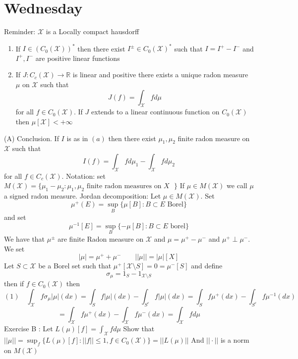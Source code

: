 \documentclass[11pt]{article}
\begin{document}
\section{Wednesday}
Reminder: $ \mathcal{X}$ is a Locally compact hausdorff
\begin{enumerate}
    \item If $I \in (C_0( \mathcal{X}))^{*}$ then there exist $I^{\pm} \in C_0( \mathcal{X})^{*}$ such that
        $I = I^{+} - I^{-}$ and $I^{+}, I^{-}$ are positive linear functions
    \item If $J: C_c( \mathcal{X}) \to \mathbb{R}$ is linear and positive there exists a unique radon
        measure $\mu$ on $ \mathcal{X}$ such that
        \[
        J(f)  = \int_{ \mathcal{X}}^{}f d\mu
        \] 
        for all $f \in C_0( \mathcal{X})$.
        If $J$ extends to a linear continuous function on  $ C_0( \mathcal{X})$ then
        $ \mu[ \mathcal{X}] < +\infty$
\end{enumerate}
(A) Conclusion. If $I $ is as in  $(a)$ then there exist  $\mu_1, \mu_2$ finite radon measure on $ \mathcal{X}$
such that
\[
I(f) = \int_{ \mathcal{X}}^{}f d\mu_1 - \int_{ \mathcal{X}}^{}f d\mu_2
\] 
for all $f \in C_c( \mathcal{X})$.
Notation: set $ M( \mathcal{X}) = \{ \mu_1 - \mu_2 : \mu_1,\mu_2 \text{ finite radon measures on $X$ }\}$ 
If $\mu \in M ( \mathcal{X})$ we call $\mu$ a signed radon measure.
Jordan decomposition: Let $\mu \in M( \mathcal{X})$. Set
\[
    \mu^{+}(E) = \sup_{B}\{ \mu[B]: B \subset E \text{ Borel}\}
\] 
and set
\[
    \mu^{-1}[E] = \sup_{B} \{-\mu[B] : B \subset E \text{ borel}\}
\] 
We have that $\mu^{\pm}$ are finite Radon measure
on $ \mathcal{X}$ and $\mu = \mu^{+} - \mu^{-}$ and $\mu^{+} \perp \mu^{-}$. We set
\[
    |\mu| = \mu^{+} + \mu^{-} \qquad ||\mu||  = |\mu|[X]
\] 
Let $S \subset \mathcal{X}$ be a Borel set such that $\mu^{+}[ \mathcal{X} \setminus S] = 0 = \mu^{-}[S]$ and define
\[
    \sigma_\mu = 1_{S} - 1_{ \mathcal{X} \setminus S}
\] 
then if $f \in C_0 ( \mathcal{X})$ then
\[
    (1) \quad  \int_{ \mathcal{X}}^{}f\sigma_\mu |\mu|(dx) = \int_{S} f |\mu|(dx) - \int_{ S^{c}}^{}f |\mu|(dx) = \int_{S}^{}f \mu^{+}(dx) - \int_{ S^{c}}^{}f \mu^{-1}(dx)
\] 
\[
= \int_{ \mathcal{X}}^{}f \mu^{+}(dx) - \int_{ \mathcal{X}}^{}f\mu^{-}(dx) = \int_{ \mathcal{X}}^{}f d\mu
\] 
Exercise B : 
Let $L(\mu)[f] = \int_{ \mathcal{X}}^{}f d\mu$
Show that $||\mu|| = \sup_f\{L(\mu)[f]: ||f|| \le 1, f \in C_{0}( \mathcal{X})\} = ||L(\mu)||$
And $||\cdot||$ is a norm on $ M( \mathcal{X})$
\end{document}
